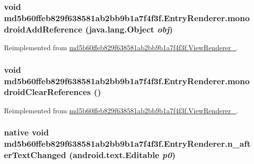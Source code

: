 \hypertarget{classmd5b60ffeb829f638581ab2bb9b1a7f4f3f_1_1_entry_renderer_874980e2f1e04a1474a4c5ff9a052a13}{
\subsubsection[{monodroidAddReference}]{\setlength{\rightskip}{0pt plus 5cm}void md5b60ffeb829f638581ab2bb9b1a7f4f3f.EntryRenderer.monodroidAddReference (java.lang.Object {\em obj})}}
\label{classmd5b60ffeb829f638581ab2bb9b1a7f4f3f_1_1_entry_renderer_874980e2f1e04a1474a4c5ff9a052a13}




Reimplemented from \hyperlink{classmd5b60ffeb829f638581ab2bb9b1a7f4f3f_1_1_view_renderer__2_64ca8244a89f60a47c173d9c0b15d610}{md5b60ffeb829f638581ab2bb9b1a7f4f3f.ViewRenderer\_}.\hypertarget{classmd5b60ffeb829f638581ab2bb9b1a7f4f3f_1_1_entry_renderer_5ad12d956145127cb1bb040a5c2d369b}{
\subsubsection[{monodroidClearReferences}]{\setlength{\rightskip}{0pt plus 5cm}void md5b60ffeb829f638581ab2bb9b1a7f4f3f.EntryRenderer.monodroidClearReferences ()}}
\label{classmd5b60ffeb829f638581ab2bb9b1a7f4f3f_1_1_entry_renderer_5ad12d956145127cb1bb040a5c2d369b}




Reimplemented from \hyperlink{classmd5b60ffeb829f638581ab2bb9b1a7f4f3f_1_1_view_renderer__2_dae20979ac761a65aa60c9b427509c37}{md5b60ffeb829f638581ab2bb9b1a7f4f3f.ViewRenderer\_}.\hypertarget{classmd5b60ffeb829f638581ab2bb9b1a7f4f3f_1_1_entry_renderer_19c60f5a213260e268a0c3061f5c578b}{
\subsubsection[{n\_\-afterTextChanged}]{\setlength{\rightskip}{0pt plus 5cm}native void md5b60ffeb829f638581ab2bb9b1a7f4f3f.EntryRenderer.n\_\-afterTextChanged (android.text.Editable {\em p0})}}
\label{classmd5b60ffeb829f638581ab2bb9b1a7f4f3f_1_1_entry_renderer_19c60f5a213260e268a0c3061f5c578b}


